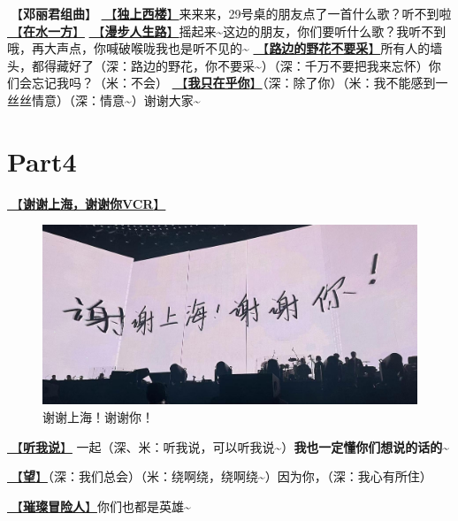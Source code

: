 \documentclass[]{ctexbook}
\begin{document}
🎵【\textbf{邓丽君组曲}】
\hyperref[one-in-the-building]{🎵【\textbf{独上西楼}】}来来来，29号桌的朋友点了一首什么歌？听不到啦
\hyperref[on-the-water-side]{🎵【\textbf{在水一方}】}
\hyperref[walk-the-road-of-life]{🎵【\textbf{漫步人生路}】}摇起来\textasciitilde 这边的朋友，你们要听什么歌？我听不到哦，再大声点，你喊破喉咙我也是听不见的\textasciitilde{}
\hyperref[only-with-me]{🎵【\textbf{路边的野花不要采}】}所有人的墙头，都得藏好了（深：路边的野花，你不要采\textasciitilde）（深：千万不要把我来忘怀）你们会忘记我吗？（米：不会）
\hyperref[only-you]{🎵【\textbf{我只在乎你}】}（深：除了你）（米：我不能感到一丝丝情意）（深：情意\textasciitilde）谢谢大家\textasciitilde{}

\newpage

\section{Part4}\label{shanghai-20240518-part4}

\hyperref[thank-you-vcr]{🎥【\textbf{谢谢上海，谢谢你VCR}】}

\begin{figure}

{\centering \includegraphics[width=400pt]{img/shanghai20240518/thank-shanghai} 

}

\caption{谢谢上海！谢谢你！}\label{fig:unnamed-chunk-35}
\end{figure}

\hyperref[listen-to-me]{🎵【\textbf{听我说}】} 一起（深、米：听我说，可以听我说\textasciitilde）\textbf{我也一定懂你们想说的话的\textasciitilde{}}

\hyperref[Gaze]{🎵【\textbf{望}】}（深：我们总会）（米：绕啊绕，绕啊绕\textasciitilde）因为你，（深：我心有所住）

\hyperref[adventurers]{🎵【\textbf{璀璨冒险人}】}你们也都是英雄\textasciitilde{}
\end{document}
